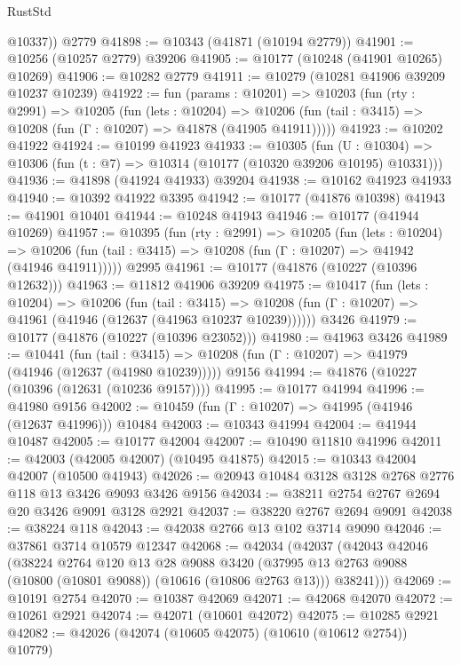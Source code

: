 \begin{lexlean}{RustStd}
\begin{coremodule}
        @10337))
    @2779
@41898 := @10343 (@41871 (@10194 @2779))
@41901 := @10256 (@10257 @2779) @39206
@41905 := @10177 (@10248 (@41901 @10265) @10269)
@41906 := @10282 @2779
@41911 := @10279 (@10281 @41906 @39209 @10237 @10239)
@41922 := fun (params : @10201) =>
  @10203
    (fun (rty : @2991) =>
    @10205
      (fun (lets : @10204) =>
      @10206 (fun (tail : @3415) => @10208 (fun (Γ : @10207) => @41878 (@41905 @41911)))))
@41923 := @10202 @41922
@41924 := @10199 @41923
@41933 := @10305
    (fun (U : @10304) => @10306 (fun (t : @7) => @10314 (@10177 (@10320 @39206 @10195) @10331)))
@41936 := @41898 (@41924 @41933) @39204
@41938 := @10162 @41923 @41933
@41940 := @10392 @41922 @3395
@41942 := @10177 (@41876 @10398)
@41943 := @41901 @10401
@41944 := @10248 @41943
@41946 := @10177 (@41944 @10269)
@41957 := @10395
    (fun (rty : @2991) =>
    @10205
      (fun (lets : @10204) =>
      @10206 (fun (tail : @3415) => @10208 (fun (Γ : @10207) => @41942 (@41946 @41911)))))
    @2995
@41961 := @10177 (@41876 (@10227 (@10396 @12632)))
@41963 := @11812 @41906 @39209
@41975 := @10417
    (fun (lets : @10204) =>
    @10206
      (fun (tail : @3415) =>
      @10208 (fun (Γ : @10207) => @41961 (@41946 (@12637 (@41963 @10237 @10239))))))
    @3426
@41979 := @10177 (@41876 (@10227 (@10396 @23052)))
@41980 := @41963 @3426
@41989 := @10441
    (fun (tail : @3415) => @10208 (fun (Γ : @10207) => @41979 (@41946 (@12637 (@41980 @10239)))))
    @9156
@41994 := @41876 (@10227 (@10396 (@12631 (@10236 @9157))))
@41995 := @10177 @41994
@41996 := @41980 @9156
@42002 := @10459 (fun (Γ : @10207) => @41995 (@41946 (@12637 @41996))) @10484
@42003 := @10343 @41994
@42004 := @41944 @10487
@42005 := @10177 @42004
@42007 := @10490 @11810 @41996
@42011 := @42003 (@42005 @42007) (@10495 @41875)
@42015 := @10343 @42004 @42007 (@10500 @41943)
@42026 := @20943 @10484 @3128 @3128 @2768 @2776 @118 @13 @3426 @9093 @3426 @9156
@42034 := @38211 @2754 @2767 @2694 @20 @3426 @9091 @3128 @2921
@42037 := @38220 @2767 @2694 @9091
@42038 := @38224 @118
@42043 := @42038 @2766 @13 @102 @3714 @9090
@42046 := @37861 @3714 @10579 @12347
@42068 := @42034
    (@42037
      (@42043
        @42046
        (@38224
          @2764
          @120
          @13
          @28
          @9088
          @3420
          (@37995 @13 @2763 @9088 (@10800 (@10801 @9088)) (@10616 (@10806 @2763 @13)))
          @38241)))
@42069 := @10191 @2754
@42070 := @10387 @42069
@42071 := @42068 @42070
@42072 := @10261 @2921
@42074 := @42071 (@10601 @42072)
@42075 := @10285 @2921
@42082 := @42026 (@42074 (@10605 @42075) (@10610 (@10612 @2754)) @10779)

\end{coremodule}
\end{lexlean}
